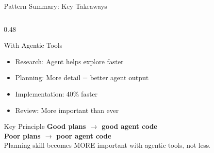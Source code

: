 \documentclass[aspectratio=169,10pt]{beamer}
\begin{document}
\begin{frame}{Pattern Summary: Key Takeaways}
\begin{columns}[T]
\begin{column}{0.48\textwidth}
\begin{block}{With Agentic Tools}
\begin{itemize}
                    \item Research: Agent helps explore faster
                    \item Planning: More detail = better agent output
                    \item Implementation: 40\% faster
                    \item Review: More important than ever
                \end{itemize}
            \end{block}
            \begin{alertblock}{Key Principle}
                \textbf{Good plans $\rightarrow$ good agent code}\\
                \textbf{Poor plans $\rightarrow$ poor agent code}\\[0.2cm]
                Planning skill becomes MORE important with agentic tools, not less.
            \end{alertblock}
        \end{column}
    \end{columns}

\end{frame}
\end{document}
